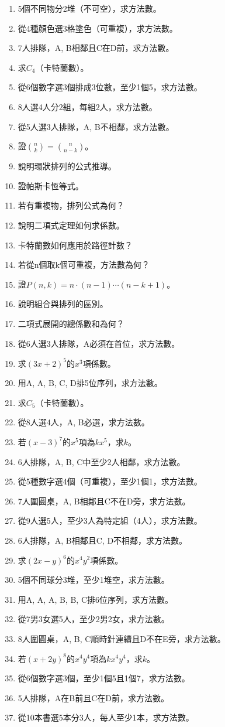\begin{enumerate}[label=\arabic*.]
    \item 5個不同物分2堆（不可空），求方法數。
    \item 從4種顏色選3格塗色（可重複），求方法數。
    \item 7人排隊，A, B相鄰且C在D前，求方法數。
    \item 求$C_4$（卡特蘭數）。
    \item 從6個數字選3個排成3位數，至少1個5，求方法數。
    \item 8人選4人分2組，每組2人，求方法數。
    \item 從5人選3人排隊，A, B不相鄰，求方法數。
    \item 證$\binom{n}{k} = \binom{n}{n-k}$。
    \item 說明環狀排列的公式推導。
    \item 證帕斯卡恆等式。
    \item 若有重複物，排列公式為何？
    \item 說明二項式定理如何求係數。
    \item 卡特蘭數如何應用於路徑計數？
    \item 若從n個取k個可重複，方法數為何？
    \item 證$P(n, k) = n \cdot (n-1) \cdots (n-k+1)$。
    \item 說明組合與排列的區別。
    \item 二項式展開的總係數和為何？
    \item 從6人選3人排隊，A必須在首位，求方法數。
    \item 求$(3x + 2)^5$的$x^3$項係數。
    \item 用A, A, B, C, D排5位序列，求方法數。
    \item 求$C_5$（卡特蘭數）。
    \item 從8人選4人，A, B必選，求方法數。
    \item 若$(x - 3)^7$的$x^5$項為$kx^5$，求$k$。
    \item 6人排隊，A, B, C中至少2人相鄰，求方法數。
    \item 從5種數字選4個（可重複），至少1個1，求方法數。
    \item 7人圍圓桌，A, B相鄰且C不在D旁，求方法數。
    \item 從9人選5人，至少3人為特定組（4人），求方法數。
    \item 6人排隊，A, B相鄰且C, D不相鄰，求方法數。
    \item 求$(2x - y)^6$的$x^4 y^2$項係數。
    \item 5個不同球分3堆，至少1堆空，求方法數。
    \item 用A, A, A, B, B, C排6位序列，求方法數。
    \item 從7男3女選5人，至少2男2女，求方法數。
    \item 8人圍圓桌，A, B, C順時針連續且D不在E旁，求方法數。
    \item 若$(x + 2y)^8$的$x^4 y^4$項為$kx^4 y^4$，求$k$。
    \item 從6個數字選3個，至少1個5且1個7，求方法數。
    \item 5人排隊，A在B前且C在D前，求方法數。
    \item 從10本書選5本分3人，每人至少1本，求方法數。
\end{enumerate}

